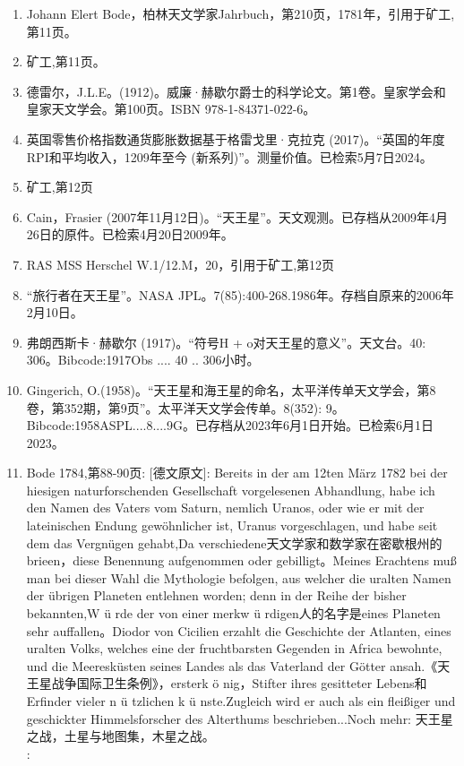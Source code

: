 \begin{enumerate}
\item Johann Elert Bode，柏林天文学家Jahrbuch，第210页，1781年，引用于矿工,第11页。
\item 矿工,第11页。
\item 德雷尔，J.L.E。(1912)。威廉·赫歇尔爵士的科学论文。第1卷。皇家学会和皇家天文学会。第100页。ISBN  978-1-84371-022-6。
\item 英国零售价格指数通货膨胀数据基于格雷戈里·克拉克 (2017)。“英国的年度RPI和平均收入，1209年至今 (新系列)”。测量价值。已检索5月7日2024。
\item 矿工,第12页
\item Cain，Frasier (2007年11月12日)。“天王星”。天文观测。已存档从2009年4月26日的原件。已检索4月20日2009年。
\item RAS MSS Herschel W.1/12.M，20，引用于矿工,第12页
\item “旅行者在天王星”。NASA JPL。7(85):400-268.1986年。存档自原来的2006年2月10日。
\item 弗朗西斯卡·赫歇尔 (1917)。“符号H + o对天王星的意义”。天文台。40: 306。Bibcode:1917Obs .... 40 .. 306小时。
\item Gingerich, O.(1958)。“天王星和海王星的命名，太平洋传单天文学会，第8卷，第352期，第9页”。太平洋天文学会传单。8(352): 9。Bibcode:1958ASPL....8....9G。已存档从2023年6月1日开始。已检索6月1日2023。
\item Bode 1784,第88-90页: [德文原文]:
Bereits in der am 12ten März 1782 bei der hiesigen naturforschenden Gesellschaft vorgelesenen Abhandlung, habe ich den Namen des Vaters vom Saturn, nemlich Uranos, oder wie er mit der lateinischen Endung gewöhnlicher ist, Uranus vorgeschlagen, und habe seit dem das Vergnügen gehabt,Da verschiedene天文学家和数学家在密歇根州的brieen，diese Benennung aufgenommen oder gebilligt。Meines Erachtens muß man bei dieser Wahl die Mythologie befolgen, aus welcher die uralten Namen der übrigen Planeten entlehnen worden; denn in der Reihe der bisher bekannten,W ü rde der von einer merkw ü rdigen人的名字是eines Planeten sehr auffallen。Diodor von Cicilien erzahlt die Geschichte der Atlanten, eines uralten Volks, welches eine der fruchtbarsten Gegenden in Africa bewohnte, und die Meeresküsten seines Landes als das Vaterland der Götter ansah.《天王星战争国际卫生条例》，ersterk ö nig，Stifter ihres gesitteter Lebens和Erfinder vieler n ü tzlichen k ü nste.Zugleich wird er auch als ein fleißiger und geschickter Himmelsforscher des Alterthums beschrieben...Noch mehr: 天王星之战，土星与地图集，木星之战。\\
[翻译]:\\

\end{enumerate}
